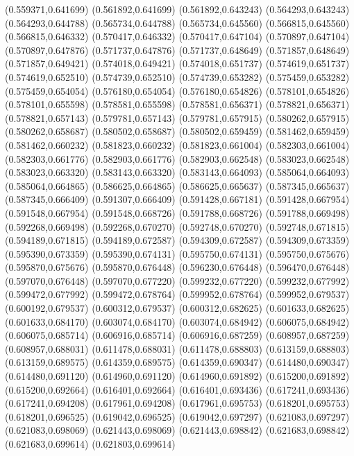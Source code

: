 (0.559371,0.641699)
(0.561892,0.641699)
(0.561892,0.643243)
(0.564293,0.643243)
(0.564293,0.644788)
(0.565734,0.644788)
(0.565734,0.645560)
(0.566815,0.645560)
(0.566815,0.646332)
(0.570417,0.646332)
(0.570417,0.647104)
(0.570897,0.647104)
(0.570897,0.647876)
(0.571737,0.647876)
(0.571737,0.648649)
(0.571857,0.648649)
(0.571857,0.649421)
(0.574018,0.649421)
(0.574018,0.651737)
(0.574619,0.651737)
(0.574619,0.652510)
(0.574739,0.652510)
(0.574739,0.653282)
(0.575459,0.653282)
(0.575459,0.654054)
(0.576180,0.654054)
(0.576180,0.654826)
(0.578101,0.654826)
(0.578101,0.655598)
(0.578581,0.655598)
(0.578581,0.656371)
(0.578821,0.656371)
(0.578821,0.657143)
(0.579781,0.657143)
(0.579781,0.657915)
(0.580262,0.657915)
(0.580262,0.658687)
(0.580502,0.658687)
(0.580502,0.659459)
(0.581462,0.659459)
(0.581462,0.660232)
(0.581823,0.660232)
(0.581823,0.661004)
(0.582303,0.661004)
(0.582303,0.661776)
(0.582903,0.661776)
(0.582903,0.662548)
(0.583023,0.662548)
(0.583023,0.663320)
(0.583143,0.663320)
(0.583143,0.664093)
(0.585064,0.664093)
(0.585064,0.664865)
(0.586625,0.664865)
(0.586625,0.665637)
(0.587345,0.665637)
(0.587345,0.666409)
(0.591307,0.666409)
(0.591428,0.667181)
(0.591428,0.667954)
(0.591548,0.667954)
(0.591548,0.668726)
(0.591788,0.668726)
(0.591788,0.669498)
(0.592268,0.669498)
(0.592268,0.670270)
(0.592748,0.670270)
(0.592748,0.671815)
(0.594189,0.671815)
(0.594189,0.672587)
(0.594309,0.672587)
(0.594309,0.673359)
(0.595390,0.673359)
(0.595390,0.674131)
(0.595750,0.674131)
(0.595750,0.675676)
(0.595870,0.675676)
(0.595870,0.676448)
(0.596230,0.676448)
(0.596470,0.676448)
(0.597070,0.676448)
(0.597070,0.677220)
(0.599232,0.677220)
(0.599232,0.677992)
(0.599472,0.677992)
(0.599472,0.678764)
(0.599952,0.678764)
(0.599952,0.679537)
(0.600192,0.679537)
(0.600312,0.679537)
(0.600312,0.682625)
(0.601633,0.682625)
(0.601633,0.684170)
(0.603074,0.684170)
(0.603074,0.684942)
(0.606075,0.684942)
(0.606075,0.685714)
(0.606916,0.685714)
(0.606916,0.687259)
(0.608957,0.687259)
(0.608957,0.688031)
(0.611478,0.688031)
(0.611478,0.688803)
(0.613159,0.688803)
(0.613159,0.689575)
(0.614359,0.689575)
(0.614359,0.690347)
(0.614480,0.690347)
(0.614480,0.691120)
(0.614960,0.691120)
(0.614960,0.691892)
(0.615200,0.691892)
(0.615200,0.692664)
(0.616401,0.692664)
(0.616401,0.693436)
(0.617241,0.693436)
(0.617241,0.694208)
(0.617961,0.694208)
(0.617961,0.695753)
(0.618201,0.695753)
(0.618201,0.696525)
(0.619042,0.696525)
(0.619042,0.697297)
(0.621083,0.697297)
(0.621083,0.698069)
(0.621443,0.698069)
(0.621443,0.698842)
(0.621683,0.698842)
(0.621683,0.699614)
(0.621803,0.699614)
